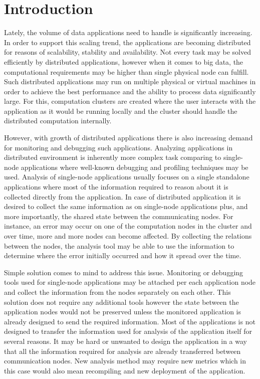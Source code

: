 \chapter{Introduction}
Lately, the volume of data applications need to handle is significantly increasing. In order to support this scaling trend, the applications are becoming distributed for reasons of scalability, stability and availability. Not every task may be solved efficiently by distributed applications, however when it comes to big data, the computational requirements may be higher than single physical node can fulfill. Such distributed applications may run on multiple physical or virtual machines in order to achieve the best performance and the ability to process data significantly large. For this, computation clusters are created where the user interacts with the application as it would be running locally and the cluster should handle the distributed computation internally.

However, with growth of distributed applications there is also increasing demand for monitoring and debugging such applications. Analyzing applications in distributed environment is inherently more complex task comparing to single-node applications where well-known debugging and profiling techniques may be used. Analysis of single-node applications usually focuses on a single standalone applications where most of the information required to reason about it is collected directly from the application. In case of distributed application it is desired to collect the same information as on single-node applications plus, and more importantly, the shared state between the communicating nodes. For instance, an error may occur on one of the computation nodes in the cluster and over time, more and more nodes can become affected. By collecting the relations between the nodes, the analysis tool may be able to use the information to determine where the error initially occurred and how it spread over the time. 

Simple solution comes to mind to address this issue. Monitoring or debugging tools used for single-node applications may be attached per each application node and collect the information from the nodes separately on each other. This solution does not require any additional tools however the state between the application nodes would not be preserved unless the monitored application is already designed to send the required information. Most of the applications is not designed to transfer the information used for analysis of the application itself for several reasons. It may be hard or unwanted to design the application in a way that all the information required for analysis are already transferred between communication nodes. New analysis method may require new metrics which in this case would also mean recompiling and new deployment of the application.

